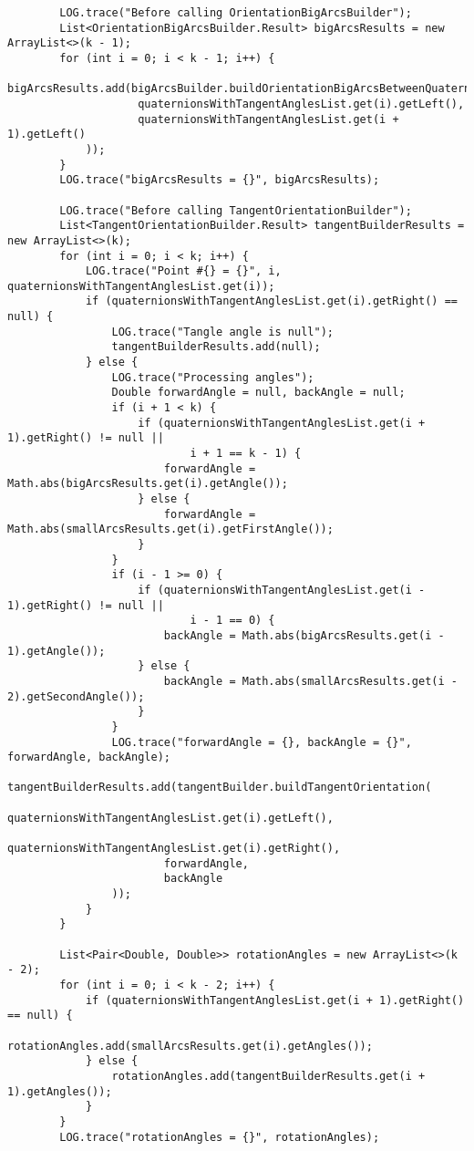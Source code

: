 \begin{verbatim}
        LOG.trace("Before calling OrientationBigArcsBuilder");
        List<OrientationBigArcsBuilder.Result> bigArcsResults = new ArrayList<>(k - 1);
        for (int i = 0; i < k - 1; i++) {
            bigArcsResults.add(bigArcsBuilder.buildOrientationBigArcsBetweenQuaternions(
                    quaternionsWithTangentAnglesList.get(i).getLeft(),
                    quaternionsWithTangentAnglesList.get(i + 1).getLeft()
            ));
        }
        LOG.trace("bigArcsResults = {}", bigArcsResults);

        LOG.trace("Before calling TangentOrientationBuilder");
        List<TangentOrientationBuilder.Result> tangentBuilderResults = new ArrayList<>(k);
        for (int i = 0; i < k; i++) {
            LOG.trace("Point #{} = {}", i, quaternionsWithTangentAnglesList.get(i));
            if (quaternionsWithTangentAnglesList.get(i).getRight() == null) {
                LOG.trace("Tangle angle is null");
                tangentBuilderResults.add(null);
            } else {
                LOG.trace("Processing angles");
                Double forwardAngle = null, backAngle = null;
                if (i + 1 < k) {
                    if (quaternionsWithTangentAnglesList.get(i + 1).getRight() != null ||
                            i + 1 == k - 1) {
                        forwardAngle = Math.abs(bigArcsResults.get(i).getAngle());
                    } else {
                        forwardAngle = Math.abs(smallArcsResults.get(i).getFirstAngle());
                    }
                }
                if (i - 1 >= 0) {
                    if (quaternionsWithTangentAnglesList.get(i - 1).getRight() != null ||
                            i - 1 == 0) {
                        backAngle = Math.abs(bigArcsResults.get(i - 1).getAngle());
                    } else {
                        backAngle = Math.abs(smallArcsResults.get(i - 2).getSecondAngle());
                    }
                }
                LOG.trace("forwardAngle = {}, backAngle = {}", forwardAngle, backAngle);
                tangentBuilderResults.add(tangentBuilder.buildTangentOrientation(
                        quaternionsWithTangentAnglesList.get(i).getLeft(),
                        quaternionsWithTangentAnglesList.get(i).getRight(),
                        forwardAngle,
                        backAngle
                ));
            }
        }

        List<Pair<Double, Double>> rotationAngles = new ArrayList<>(k - 2);
        for (int i = 0; i < k - 2; i++) {
            if (quaternionsWithTangentAnglesList.get(i + 1).getRight() == null) {
                rotationAngles.add(smallArcsResults.get(i).getAngles());
            } else {
                rotationAngles.add(tangentBuilderResults.get(i + 1).getAngles());
            }
        }
        LOG.trace("rotationAngles = {}", rotationAngles);


\end{verbatim}
